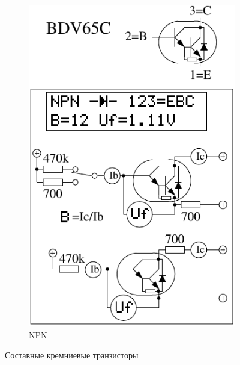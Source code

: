 \begin{figure}[H]
\begin{subfigure}[b]{.5\textwidth}
    \includegraphics[width=1.\textwidth]{../FIG/BJT_BDV65.pdf}
    \caption{NPN}
    \label{fig:BJT-NPN-Darl-R-D}
  \end{subfigure}
  \caption{Составные кремниевые транзисторы}
\end{figure}

